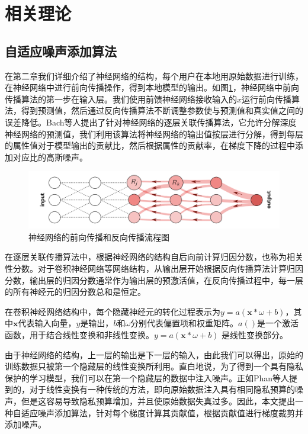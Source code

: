 \section{相关理论}

\subsection{自适应噪声添加算法}
在第二章我们详细介绍了神经网络的结构，每个用户在本地用原始数据进行训练，在神经网络中进行前向传播操作，得到本地模型的输出。如图\ref{fig:神经网络的前向传播和反向传播流程图}，神经网络中前向传播算法的第一步在输入层。我们使用前馈神经网络接收输入的$x$运行前向传播算法，得到预测值，然后通过反向传播算法不断调整参数使与预测值和真实值之间的误差降低。Bach等人提出了针对神经网络的逐层关联传播算法，它允许分解深度神经网络的预测值，我们利用该算法将神经网络的输出值按层进行分解，得到每层的属性值对于模型输出的贡献比，然后根据属性的贡献率，在梯度下降的过程中添加对应比的高斯噪声。

\begin{figure}[!hbt]
\centering
	\includegraphics[scale=0.45]{fig2/C3/逐层关联传播算法}%
	\caption{神经网络的前向传播和反向传播流程图}
	\label{fig:神经网络的前向传播和反向传播流程图}	
\end{figure}

在逐层关联传播算法中，根据神经网络的结构自后向前计算归因分数，也称为相关性分数。对于卷积神经网络等网络结构，从输出层开始根据反向传播算法计算归因分数，输出层的归因分数通常作为输出层的预激活值，在反向传播过程中，每一层的所有神经元的归因分数总和是恒定。

在卷积神经网络结构中，每个隐藏神经元的转化过程表示为$y=a(\mathbf{x} * \omega+b)$，其中$\mathbf{x}$代表输入向量，$y$是输出，$b$和$\omega$分别代表{}偏置项和权重矩阵。$a()$是一个激活函数，用于结合线性变换和非线性变换。$y=a(\mathbf{x} * \omega+b)$ 是线性变换部分。

由于神经网络的结构，上一层的输出是下一层的输入，由此我们可以得出，原始的训练数据只被第一个隐藏层的线性变换所利用。直白地说，为了得到一个具有隐私保护的学习模型，我们可以在第一个隐藏层的数据中注入噪声。正如Phan等人提到的，对于线性变换有一种传统的方法，即向原始数据注入具有相同隐私预算的噪声，但是这容易导致隐私预算增加，并且使原始数据失真过多。因此，本文提出一种自适应噪声添加算法，针对每个梯度计算其贡献值，根据贡献值进行梯度裁剪并添加噪声。

